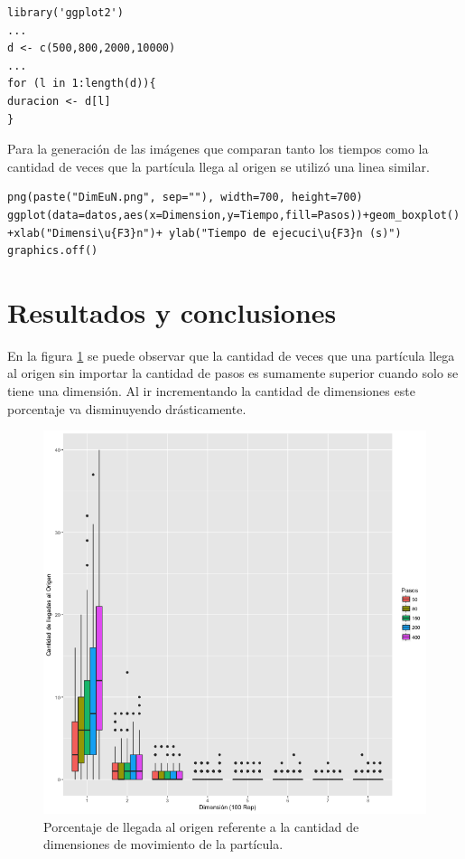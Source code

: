 \documentclass[a4paper]{article}
\begin{document}
\begin{lstlisting}[frame=single]
library('ggplot2')
...
d <- c(500,800,2000,10000)
...
for (l in 1:length(d)){
duracion <- d[l]
}
\end{lstlisting}

Para la generación de las imágenes que comparan tanto los tiempos como la cantidad de veces que la partícula llega al origen se utilizó una linea similar.
\begin{lstlisting}[frame=single]
png(paste("DimEuN.png", sep=""), width=700, height=700)
ggplot(data=datos,aes(x=Dimension,y=Tiempo,fill=Pasos))+geom_boxplot()
+xlab("Dimensi\u{F3}n")+ ylab("Tiempo de ejecuci\u{F3}n (s)")
graphics.off()
\end{lstlisting}

\section{Resultados y conclusiones}
En la figura \ref{fig:PorcentajesEu} se puede observar que la cantidad de veces que una partícula llega al origen sin importar la cantidad de pasos es sumamente superior cuando solo se tiene una dimensión. Al ir incrementando la cantidad de dimensiones este porcentaje va disminuyendo drásticamente.

\begin{figure}[h]
\centering
\includegraphics[width=0.7\linewidth]{PorcentajesEu}
\caption{Porcentaje de llegada al origen referente a la cantidad de dimensiones de movimiento de la partícula.}
\label{fig:PorcentajesEu}
\end{figure}
\end{document}
